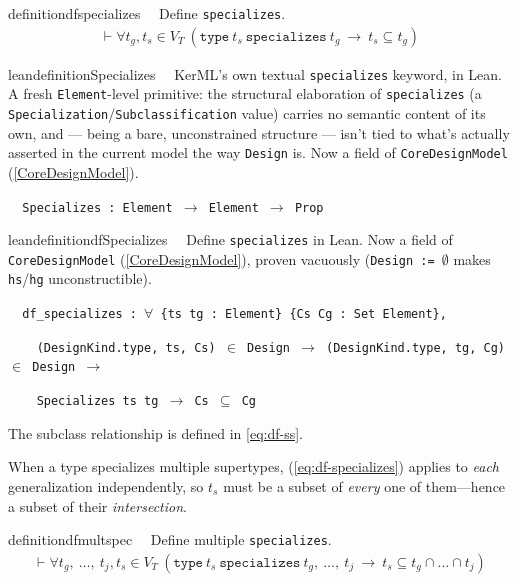\begin{restatable}{definition}{dfspecializes}~~ Define \texttt{specializes}.
\begin{align}
\vdash \forall t_g , t_s \in V_T ~(\texttt{type}~t_s~\texttt{specializes}~t_g ~\rightarrow~ t_s \subseteq t_g)\label{eq:df-specializes}\tag{df-specializes}
\end{align}
\end{restatable}

\begin{restatable}{leandefinition}{Specializes}~~ KerML's own textual \texttt{specializes} keyword,
in Lean. A fresh \texttt{Element}-level primitive: the structural elaboration of \texttt{specializes} (a
\texttt{Specialization}/\texttt{Subclassification} value) carries no semantic content of its own, and --- being a
bare, unconstrained structure --- isn't tied to what's actually asserted in the current model the way
\texttt{Design} is. Now a field of \texttt{CoreDesignModel} (\ref{CoreDesignModel}).

\texttt{~~Specializes : Element $\to$ Element $\to$ Prop}
\label{Specializes}
\end{restatable}

\begin{restatable}{leandefinition}{dfSpecializes}~~ Define \texttt{specializes} in Lean.
Now a field of \texttt{CoreDesignModel} (\ref{CoreDesignModel}), proven vacuously (\texttt{Design :=
$\emptyset$} makes \texttt{hs}/\texttt{hg} unconstructible).

\texttt{~~df\_specializes : $\forall$ \{ts tg : Element\} \{Cs Cg : Set Element\},}

\texttt{~~~~(DesignKind.type, ts, Cs) $\in$ Design $\to$ (DesignKind.type, tg, Cg) $\in$ Design $\to$}

\texttt{~~~~Specializes ts tg $\to$ Cs $\subseteq$ Cg}
\label{df_specializes}
\end{restatable}

\pn The subclass relationship is defined in \ref{eq:df-ss}.

\pn When a type specializes multiple supertypes, (\ref{eq:df-specializes}) applies to \emph{each} generalization independently, so $t_s$ must be a subset of \emph{every} one of them---hence a subset of their \emph{intersection}.

\begin{restatable}{definition}{dfmultspec}~~ Define multiple \texttt{specializes}.
\begin{align}
\vdash \forall t_g ,~ \ldots,~ t_j, t_s \in V_T ~(\texttt{type}~t_s~\texttt{specializes}~t_g,~ \ldots, ~t_j ~\rightarrow~ t_s \subseteq t_g \cap \ldots \cap t_j)\label{eq:df-multspec}\tag{df-multspec}
\end{align}
\end{restatable}

